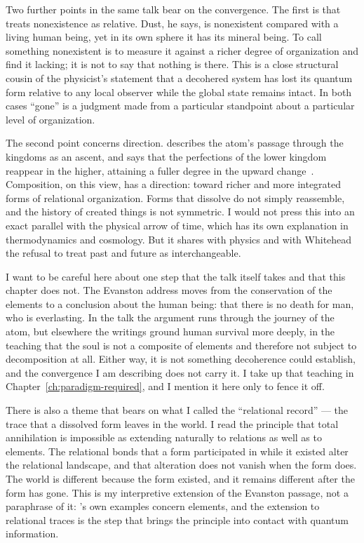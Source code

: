 Two further points in the same talk bear on the convergence.
The first is that \AbdulBaha treats nonexistence as relative.
Dust, he says, is nonexistent compared with a living human being, yet in its own sphere it has its mineral being.
To call something nonexistent is to measure it against a richer degree of organization and find it lacking; it is not to say that nothing is there.
This is a close structural cousin of the physicist's statement that a decohered system has lost its quantum form relative to any local observer while the global state remains intact.
In both cases ``gone'' is a judgment made from a particular standpoint about a particular level of organization.

The second point concerns direction.
\AbdulBaha describes the atom's passage through the kingdoms as an ascent, and says that the perfections of the lower kingdom reappear in the higher, attaining a fuller degree in the upward change~\citep[Talk 38]{PUP}.
Composition, on this view, has a direction: toward richer and more integrated forms of relational organization.
Forms that dissolve do not simply reassemble, and the history of created things is not symmetric.
I would not press this into an exact parallel with the physical arrow of time, which has its own explanation in thermodynamics and cosmology.
But it shares with physics and with Whitehead the refusal to treat past and future as interchangeable.

I want to be careful here about one step that the talk itself takes and that this chapter does not.
The Evanston address moves from the conservation of the elements to a conclusion about the human being: that there is no death for man, who is everlasting.
In the talk the argument runs through the journey of the atom, but elsewhere the \bahai writings ground human survival more deeply, in the teaching that the soul is not a composite of elements and therefore not subject to decomposition at all.
Either way, it is not something decoherence could establish, and the convergence I am describing does not carry it.
I take up that teaching in Chapter~\ref{ch:paradigm-required}, and I mention it here only to fence it off.

There is also a theme that bears on what I called the ``relational record'' --- the trace that a dissolved form leaves in the world.
I read the principle that total annihilation is impossible as extending naturally to relations as well as to elements.
The relational bonds that a form participated in while it existed alter the relational landscape, and that alteration does not vanish when the form does.
The world is different because the form existed, and it remains different after the form has gone.
This is my interpretive extension of the Evanston passage, not a paraphrase of it: \AbdulBaha's own examples concern elements, and the extension to relational traces is the step that brings the principle into contact with quantum information.

